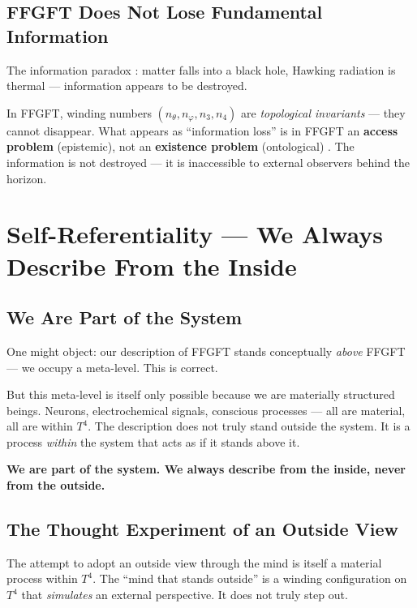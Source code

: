 \subsection{FFGFT Does Not Lose Fundamental Information}

The information paradox \cite{Hawking1974}: matter falls into a black hole, Hawking radiation is thermal --- information appears to be destroyed.

In FFGFT, winding numbers $(n_\theta, n_\varphi, n_3, n_4)$ are \emph{topological invariants} --- they cannot disappear. What appears as ``information loss'' is in FFGFT an \textbf{access problem} (epistemic), not an \textbf{existence problem} (ontological) \cite{Bekenstein1973}. The information is not destroyed --- it is inaccessible to external observers behind the horizon.

\section{Self-Referentiality --- We Always Describe From the Inside}

\subsection{We Are Part of the System}

One might object: our description of FFGFT stands conceptually \emph{above} FFGFT --- we occupy a meta-level. This is correct.

But this meta-level is itself only possible because we are materially structured beings. Neurons, electrochemical signals, conscious processes --- all are material, all are within $T^4$. The description does not truly stand outside the system. It is a process \emph{within} the system that acts as if it stands above it.

\begin{erkenntnis}
\textbf{We are part of the system. We always describe from the inside, never from the outside.}
\end{erkenntnis}

\subsection{The Thought Experiment of an Outside View}

The attempt to adopt an outside view through the mind is itself a material process within $T^4$. The ``mind that stands outside'' is a winding configuration on $T^4$ that \emph{simulates} an external perspective. It does not truly step out.

